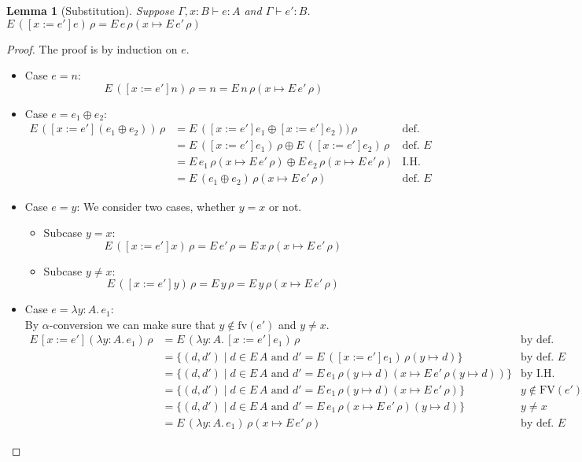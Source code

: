 \documentclass{tufte-handout}
\newcommand{\LAM}[1]{\lambda #1.\,}
\newcommand{\of}[0]{\!:\!}
\newcommand{\by}[0]{\!:=\!}
\newcommand{\ext}[3]{#3(#1{\mapsto}#2)}
\newtheorem{lemma}[theorem]{Lemma}
\begin{document}
\begin{lemma}[Substitution]
  \label{lem:stlc-subst}
  Suppose $\Gamma,x \of B \vdash e : A$ and $\Gamma \vdash e' : B$.
  $E\,([x\by e']e)\,\rho = E\,e\,\ext{x}{E\,e'\,\rho}{\rho}$
\end{lemma}
\begin{proof}
  The proof is by induction on $e$.
  \begin{itemize}
  \item Case $e=n$:
    \[
    E\,([x\by e']n)\,\rho = n = E\,n\,\ext{x}{E\,e'\,\rho}{\rho}
    \]
  \item Case $e=e_1 \oplus e_2$:
    \begin{align*}
      E\,([x\by e'](e_1 \oplus e_2))\,\rho 
      &= E\,([x\by e']e_1 \oplus [x\by e']e_2))\,\rho  & \text{def. substitution}\\
      &= E\,([x\by e']e_1)\,\rho \oplus E\,([x\by e']e_2)\,\rho  & \text{def. $E$ } \\
      &= E\,e_1\,\ext{x}{E\,e'\,\rho}{\rho} \oplus E\,e_2\,\ext{x}{E\,e'\,\rho}{\rho} & \text{I.H.}\\
      &= E\,(e_1 \oplus e_2)\,\ext{x}{E\,e'\,\rho}{\rho} & \text{def. $E$}
    \end{align*}

  \item Case $e=y$:
    We consider two cases, whether $y=x$ or not.
    \begin{itemize}
    \item Subcase $y=x$:
      \[
        E\,([x\by e']x)\,\rho 
        = E\,e'\,\rho 
        = E\,x\,\ext{x}{E\,e'\,\rho}{\rho}
        \]
    \item Subcase $y\neq x$:
      \[
      E\,([x\by e']y)\,\rho
      =
      E\,y\,\rho
      = E\,y\,\ext{x}{E\,e'\,\rho}{\rho}
      \]
    \end{itemize}

  \item Case $e=\LAM{y \of A} e_1$: \\
    By $\alpha$-conversion we can make sure that $y \notin
    \mathrm{fv}(e')$ and $y \neq x$.
    \begin{align*}
      E\,[x\by e'](\LAM{y \of A} e_1)\,\rho
      &= E\,(\LAM{y \of A} [x\by e']e_1)\,\rho &\text{by def. substitution} \\
      &= \{ (d,d') \mid d \in E\,A \text{ and }
          d' {=} E \,([x\by e']e_1)\,\ext{y}{d}{\rho} \} & \text{by def. $E$} \\
      &= \{ (d,d') \mid d \in E\,A \text{ and }
          d' {=} E \,e_1\,\ext{x}{E\,e'\,\ext{y}{d}{\rho}}{\ext{y}{d}{\rho}} \} & \text{by I.H.} \\
      &= \{ (d,d') \mid d \in E\,A \text{ and }
          d' {=} E \,e_1\,\ext{x}{E\,e'\,\rho}{\ext{y}{d}{\rho}} \} & y \notin \mathrm{FV}(e') \\
      &= \{ (d,d') \mid d \in E\,A \text{ and }
          d' {=} E \,e_1\,\ext{y}{d}{\ext{x}{E\,e'\,\rho}{\rho}} \} & y \neq x \\
      &= E\,(\LAM{y \of A} e_1)\,\ext{x}{E\,e'\,\rho}{\rho} & \text{by def. $E$}
    \end{align*}
    

\end{itemize}
\end{proof}
\end{document}
